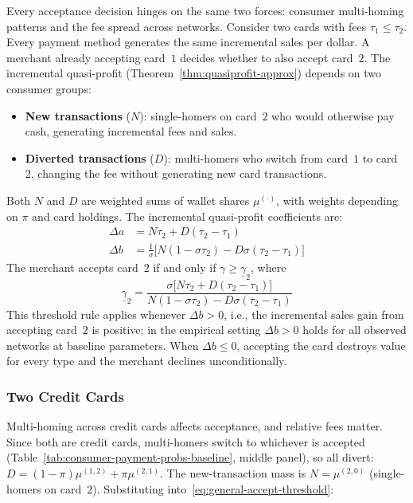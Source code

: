 \documentclass[main.tex]{subfiles}
\begin{document}
Every acceptance decision hinges on the same two forces: consumer multi-homing patterns and the fee spread across networks.
Consider two cards with fees $\tau_1 \leq \tau_2$.
Every payment method generates the same incremental sales per dollar.
A merchant already accepting card~$1$ decides whether to also accept card~$2$.
The incremental quasi-profit (Theorem~\ref{thm:quasiprofit-approx}) depends on two consumer groups:
\begin{itemize}
\item \textbf{New transactions} ($N$): single-homers on card~$2$ who would otherwise pay cash, generating incremental fees and sales.
\item \textbf{Diverted transactions} ($D$): multi-homers who switch from card~$1$ to card~$2$, changing the fee without generating new card transactions.
\end{itemize}
Both $N$ and $D$ are weighted sums of wallet shares $\mu^{(\cdot)}$, with weights depending on $\pi$ and card holdings.
The incremental quasi-profit coefficients are:
\begin{align}
\Delta a &= N\tau_2 + D(\tau_2 - \tau_1) \label{eq:a12-decomp}\\
\Delta b &= \tfrac{1}{\sigma}\bigl[N(1-\sigma\tau_2) - D\sigma(\tau_2-\tau_1)\bigr] \label{eq:b12-decomp}
\end{align}
The merchant accepts card~$2$ if and only if $\gamma \geq \underline{\gamma}_2$, where
\begin{equation}
\underline{\gamma}_2 = \frac{\sigma\bigl[N\tau_2 + D(\tau_2 - \tau_1)\bigr]}{N(1-\sigma\tau_2) - D\sigma(\tau_2-\tau_1)} \label{eq:general-accept-threshold}
\end{equation}
This threshold rule applies whenever $\Delta b > 0$, i.e., the incremental sales gain from accepting card~$2$ is positive; in the empirical setting $\Delta b > 0$ holds for all observed networks at baseline parameters. When $\Delta b \leq 0$, accepting the card destroys value for every type and the merchant declines unconditionally.

\subsubsection{Two Credit Cards}\label{subsubsec:oa-two-credit}

Multi-homing across credit cards affects acceptance, and relative fees matter.
Since both are credit cards, multi-homers switch to whichever is accepted (Table~\ref{tab:consumer-payment-probs-baseline}, middle panel), so all divert: $D = (1-\pi)\mu^{(1,2)} + \pi\mu^{(2,1)}$.
The new-transaction mass is $N = \mu^{(2,0)}$ (single-homers on card~$2$).
Substituting into~\eqref{eq:general-accept-threshold}:
\end{document}
